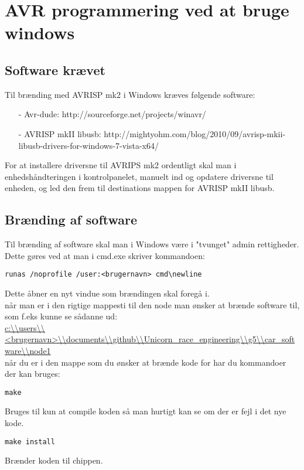 \chapter{AVR programmering ved at bruge windows}
\section{Software krævet}
Til brænding med AVRISP mk2 i Windows kræves følgende software:
\begin{enumerate}
	\item[-]{Avr-dude:				http://sourceforge.net/projects/winavr/}
	\item[-]{AVRISP mkII libusb:	http://mightyohm.com/blog/2010/09/avrisp-mkii-libusb-drivers-for-windows-7-vista-x64/}
\end{enumerate}

For at installere driversne til AVRIPS mk2 ordentligt skal man i enhedshåndteringen i kontrolpanelet, manuelt ind og opdatere driversne til enheden, og led den frem til destinations mappen for AVRISP mkII libusb.

\section{Brænding af software}
Til brænding af software skal man i Windows være i "tvunget" admin rettigheder.
\newline
Dette gøres ved at man i cmd.exe skriver kommandoen:
\begin{lstlisting}
runas /noprofile /user:<brugernavn> cmd\newline
\end{lstlisting}
Dette åbner en nyt vindue som brændingen skal foregå i.\\
når man er i den rigtige mappesti til den node man ønsker at brænde software til, som f.eks kunne se sådanne ud:\\
\url{c:\\users\\<brugernavn>\\documents\\github\\Unicorn_race_engineering\\g5\\car_software\\node1} \\
når du er i den mappe som du ønsker at brænde kode for har du kommandoer der kan bruges:
\begin{lstlisting}
make
\end{lstlisting}
Bruges til kun at compile koden så man hurtigt kan se om der er fejl i det nye kode.
\begin{lstlisting}
make install
\end{lstlisting}
Brænder koden til chippen.